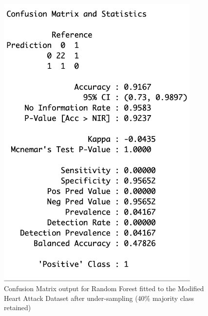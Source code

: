 \begin{figure}[!htbp]
    \centering
    \begin{minipage}{0.45\textwidth}
        \centering
        \includegraphics[width=0.9\textwidth]{ThesisTemplate/appendix/images/Chapter5Appendix/ConfusionMatrix40/modHA.png}
        \caption{Confusion Matrix output for Random Forest fitted to the Modified Heart Attack Dataset after under-sampling (40\% majority class retained)}
        \label{fig:matrixmodHA40}
    \end{minipage}\hfill
    \begin{minipage}{0.45\textwidth}
        \centering

\end{minipage}
\end{figure}
